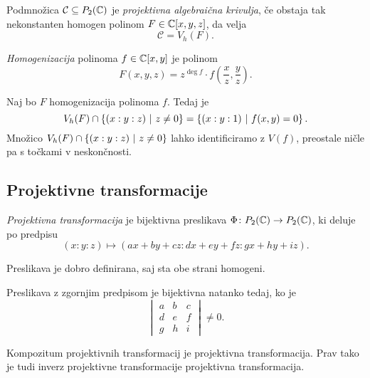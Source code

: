 \begin{definicija}
Podmnožica $\mathcal{C} \subseteq P_2(\mathbb{C})$ je
\emph{projektivna algebraična krivulja},
če obstaja tak nekonstanten homogen polinom $F \in \mathbb{C}[x, y, z]$,
da velja
\[
\mathcal{C} = V_h(F).
\]
\end{definicija}

\begin{definicija}
\emph{Homogenizacija} polinoma
$f \in \mathbb{C}[x,y]$ je polinom
\[
F(x, y, z) =
z^{\deg f} \cdot f\left(\frac{x}{z}, \frac{y}{z} \right).
\]
\end{definicija}


\begin{opomba}
Naj bo $F$ homogenizacija polinoma $f$. Tedaj je
\[
V_h(F) \cap \left\{(x : y : z)~\middle\vert~z \ne 0\right\} =
\left\{(x : y : 1)~\middle\vert~f(x, y) = 0\right\}.
\]
Množico $V_h(F) \cap \left\{(x : y : z)~\middle\vert~z \ne 0\right\}$ lahko
identificiramo z $V(f)$, preostale ničle pa s točkami v
neskončnosti.
\end{opomba}

\newpage

\subsection{Projektivne transformacije}

\begin{definicija}
\emph{Projektivna transformacija}
je bijektivna preslikava $\Phi \colon P_2(\mathbb{C}) \to P_2(\mathbb{C})$, ki
deluje po predpisu
\[
(x : y : z) \mapsto (ax + by + cz : dx + ey + fz : gx + hy + iz).
\]
\end{definicija}

\begin{opomba}
Preslikava je dobro definirana, saj sta obe strani homogeni.
\end{opomba}

\begin{trditev}
Preslikava z zgornjim predpisom je bijektivna natanko tedaj, ko je
\[
\begin{vmatrix}
a & b & c \\
d & e & f \\
g & h & i
\end{vmatrix}
\ne 0.
\]
\end{trditev}

\obvs

\begin{opomba}
Kompozitum projektivnih transformacij je projektivna
transformacija. Prav tako je tudi inverz projektivne transformacije
projektivna transformacija.
\end{opomba}

